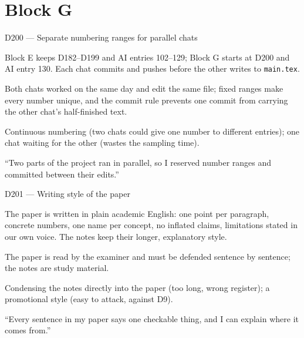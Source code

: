 \documentclass[11pt,a4paper]{report}
\begin{document}
\section{Block G}\label{sec:decisions-g}

\begin{decisionbox}{D200 --- Separate numbering ranges for parallel chats}
\begin{description}[nosep, leftmargin=0pt]
  \item[Decision.] Block E keeps D182--D199 and AI entries 102--129; Block G
    starts at D200 and AI entry 130. Each chat commits and pushes before the
    other writes to \texttt{main.tex}.
  \item[Why.] Both chats worked on the same day and edit the same file; fixed
    ranges make every number unique, and the commit rule prevents one commit
    from carrying the other chat's half-finished text.
  \item[Alternatives.] Continuous numbering (two chats could give one number
    to different entries); one chat waiting for the other (wastes the
    sampling time).
  \item[Interview line.] ``Two parts of the project ran in parallel, so I
    reserved number ranges and committed between their edits.''
\end{description}
\end{decisionbox}

\begin{decisionbox}{D201 --- Writing style of the paper}
\begin{description}[nosep, leftmargin=0pt]
  \item[Decision.] The paper is written in plain academic English: one point
    per paragraph, concrete numbers, one name per concept, no inflated claims,
    limitations stated in our own voice. The notes keep their longer,
    explanatory style.
  \item[Why.] The paper is read by the examiner and must be defended sentence
    by sentence; the notes are study material.
  \item[Alternatives.] Condensing the notes directly into the paper (too
    long, wrong register); a promotional style (easy to attack, against D9).
  \item[Interview line.] ``Every sentence in my paper says one checkable thing,
    and I can explain where it comes from.''
\end{description}
\end{decisionbox}
\end{document}
